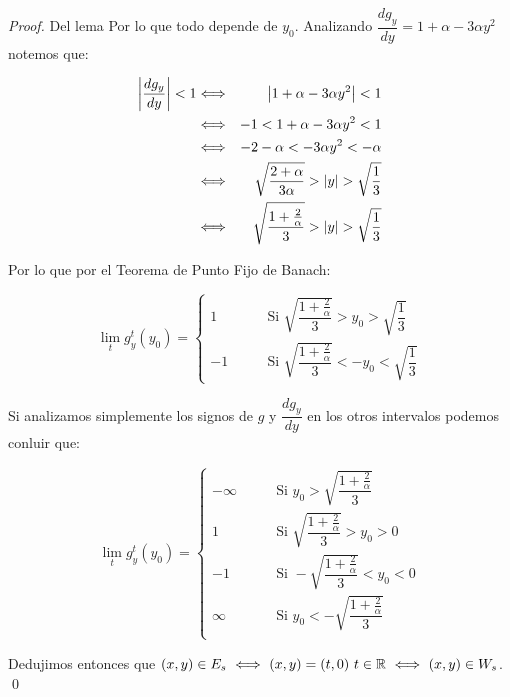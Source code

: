 \begin{example}
\begin{proof}{Del lema}
		Por lo que todo depende de $y_0$. Analizando $\dfrac{d g_y}{dy} = 1 + \alpha - 3\alpha y^2$ notemos que:
		
		\begin{equation*}
		\begin{aligned}
		\left\lvert\dfrac{d g_y}{dy}\right\rvert < 1  & \Longleftrightarrow & \left\lvert1 + \alpha - 3\alpha y^2\right\rvert < 1 \\
		& \Longleftrightarrow & -1 < 1 + \alpha - 3\alpha y^2 < 1 \\
		& \Longleftrightarrow &  -2 - \alpha < -3 \alpha y^2 < -\alpha \\
		& \Longleftrightarrow &  \sqrt{\dfrac{2 + \alpha}{3\alpha}} > \left\lvert y\right\rvert > \sqrt{\dfrac{1}{3}} \\
		& \Longleftrightarrow &  \sqrt{\dfrac{1 + \frac{2}{\alpha}}{3}} > \left\lvert y\right\rvert > \sqrt{\dfrac{1}{3}}
		\end{aligned}
		\end{equation*}
		
		Por lo que por el Teorema de Punto Fijo de Banach:
		
		
		\begin{equation*}
		\lim\limits_t g_y^t(y_0) = \left\lbrace \begin{aligned}
		1 & \qquad \text{Si } \sqrt{\dfrac{1 + \frac{2}{\alpha}}{3}} > y_0 > \sqrt{\dfrac{1}{3}} \\
		-1 & \qquad \text{Si } \sqrt{\dfrac{1 + \frac{2}{\alpha}}{3}} < -y_0 < \sqrt{\dfrac{1}{3}}
		\end{aligned} \right.
		\end{equation*}
		
		Si analizamos simplemente los signos de $g$ y $\dfrac{d g_y}{dy}$ en los otros intervalos podemos conluir que:
		
		\begin{equation*}
		\lim\limits_t g_y^t(y_0) = \left\lbrace \begin{aligned}
		-\infty & \qquad \text{Si } y_0 >  \sqrt{\dfrac{1 + \frac{2}{\alpha}}{3}} \\
		1 & \qquad \text{Si } \sqrt{\dfrac{1 + \frac{2}{\alpha}}{3}} > y_0 > 0 \\
		-1 & \qquad \text{Si } -\sqrt{\dfrac{1 + \frac{2}{\alpha}}{3}} < y_0 < 0 \\
		\infty & \qquad \text{Si } y_0 < -\sqrt{\dfrac{1 + \frac{2}{\alpha}}{3}} \\
		\end{aligned} \right.
		\end{equation*}
		
		Dedujimos entonces que $(x,y) \in E_s \ \Longleftrightarrow \ (x,y) = (t,0) \ t \in \R \ \Longleftrightarrow \ (x,y) \in W_s$. \qed
		
	\end{proof}
	
\end{example}


